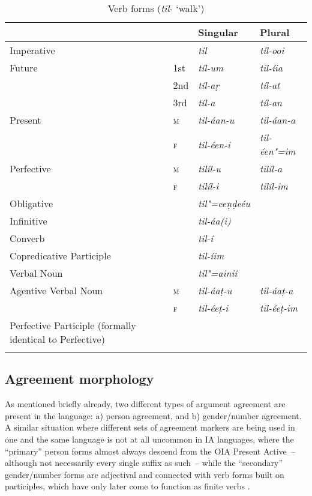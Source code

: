 \begin{table}[ht]
\caption{Verb forms (\textit{til}- `walk')}

\begin{tabularx}{\textwidth}{ Q l@{\hspace{20pt}} l@{\hspace{20pt}} l@{\hspace{20pt}} }
\lsptoprule
&
&
Singular &
Plural\\\hline
Imperative &
&
\textit{til} &
\textit{tíl-ooi} \\
Future &
1st &
\textit{tíl-um} &
\textit{til-íia} \\
&
2nd &
\textit{tíl-aṛ} &
\textit{tíl-at} \\
&
3rd &
\textit{tíl-a} &
\textit{tíl-an} \\
Present &
\textsc{m} &
\textit{til-áan-u} &
\textit{til-áan-a} \\
&
\textsc{f} &
\textit{til-éen-i} &
\textit{til-éen"=im} \\
Perfective &
\textsc{m} &
\textit{tilíl-u} &
\textit{tilíl-a} \\
&
\textsc{f} &
\textit{tilíl-i} &
\textit{tilíl-im} \\
Obligative &
&
\textit{til"=eeṇḍeéu} &
\\
Infinitive &
&
\textit{til-áa(i)} &
\\
Converb &
&
\textit{til-í} &
\\
Copredicative Participle &
&
\textit{til-íim} &
\\
Verbal Noun &
&
\textit{til"=ainií} &
\\
Agentive Verbal Noun &
\textsc{m} &
\textit{til-áaṭ-u} &
\textit{til-áaṭ-a} \\
&
\textsc{f} &
\textit{til-éeṭ-i} &
\textit{til-éeṭ-im} \\
Perfective Participle\newline
(formally identical to Perfective) &
&
&
\\\lspbottomrule
\end{tabularx}
\label{tab:8-15}
\end{table}


\subsection{Agreement morphology}
\label{subsec:8-4-1}

As mentioned briefly already, two different types of argument agreement are present in the language: a) person agreement, and b) gender/number agreement. A similar situation where different sets of agreement markers are being used in one and the same language is not at all uncommon in IA languages, where the ``primary'' person forms almost always descend from the OIA Present Active~-- although not necessarily every single suffix as such~-- while the ``secondary'' gender/number forms are adjectival and connected with verb forms built on participles, which have only later come to function as finite verbs \citep[259--260]{masica1991}. 



